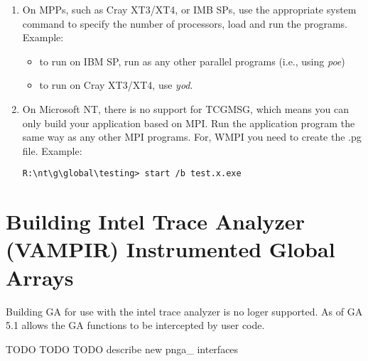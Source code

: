 \begin{enumerate}

\item On MPPs, such as Cray XT3/XT4, or IMB SPs, use the appropriate system
command to specify the number of processors, load and run the programs.
Example: 
\begin{itemize}
\item to run on IBM SP, run as any other parallel programs (i.e., using
\emph{poe}) 
\item to run on Cray XT3/XT4, use \emph{yod}.
\end{itemize}

\item On Microsoft NT, there is no support for TCGMSG, which means you can only
build your application based on MPI. Run the application program the same way
as any other MPI programs. For, WMPI you need to create the .pg file. Example:
\begin{verbatim}
R:\nt\g\global\testing> start /b test.x.exe
\end{verbatim}
\end{enumerate}

\section{Building Intel Trace Analyzer (VAMPIR) Instrumented Global Arrays}

Building GA for use with the intel trace analyzer is no loger supported. As of
GA 5.1 allows the GA functions to be intercepted by user code.

TODO TODO TODO describe new pnga\_ interfaces
